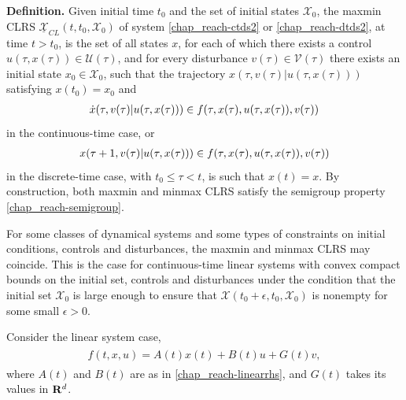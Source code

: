 \documentclass[letterpaper,10pt,english]{sphinxmanual}
\begin{document}
\textbf{Definition.} Given initial time $t_0$ and the set of initial states ${\mathcal X}_0$, the
maxmin CLRS $\underline{{\mathcal X}}_{CL}(t, t_0, {\mathcal X}_0)$ of system
\eqref{chap_reach-ctds2} or \eqref{chap_reach-dtds2}, at time $t>t_0$, is the set of all states
$x$, for each of which there exists a control
$u(\tau, x(\tau))\in{\mathcal U}(\tau)$, and for every disturbance
$v(\tau)\in{\mathcal V}(\tau)$ there exists an initial state
$x_0\in{\mathcal X}_0$, such that the trajectory
$x(\tau, v(\tau) | u(\tau, x(\tau)))$ satisfying
$x(t_0) = x_0$ and
\begin{gather}
\begin{split}\dot{x}(\tau, v(\tau) | u(\tau, x(\tau))) \in
f(\tau, x(\tau), u(\tau, x(\tau)), v(\tau))\end{split}\notag
\end{gather}
in the continuous-time case, or
\begin{gather}
\begin{split}x(\tau+1, v(\tau) | u(\tau, x(\tau))) \in
f(\tau, x(\tau), u(\tau, x(\tau)), v(\tau))\end{split}\notag
\end{gather}
in the discrete-time case, with $t_0\leqslant\tau<t$, is such
that $x(t)=x$.
By construction, both
maxmin and minmax CLRS satisfy the semigroup property \eqref{chap_reach-semigroup}.

For some classes of dynamical systems and some types of constraints on
initial conditions, controls and disturbances, the maxmin and minmax
CLRS may coincide. This is the case for continuous-time linear systems
with convex compact bounds on the initial set, controls and disturbances
under the condition that the initial set ${\mathcal X}_0$ is large
enough to ensure that
${\mathcal X}(t_0+\epsilon, t_0, {\mathcal X}_0)$ is nonempty for
some small $\epsilon>0$.

Consider the linear system case,
\label{chap_reach:equation-linearrhsdist}\begin{gather}
\begin{split}f(t, x, u) = A(t)x(t) + B(t)u + G(t)v,\end{split}\label{chap_reach-linearrhsdist}
\end{gather}
where $A(t)$ and $B(t)$ are as in \eqref{chap_reach-linearrhs}, and
$G(t)$ takes its values in ${\bf R}^d$.
\end{document}
